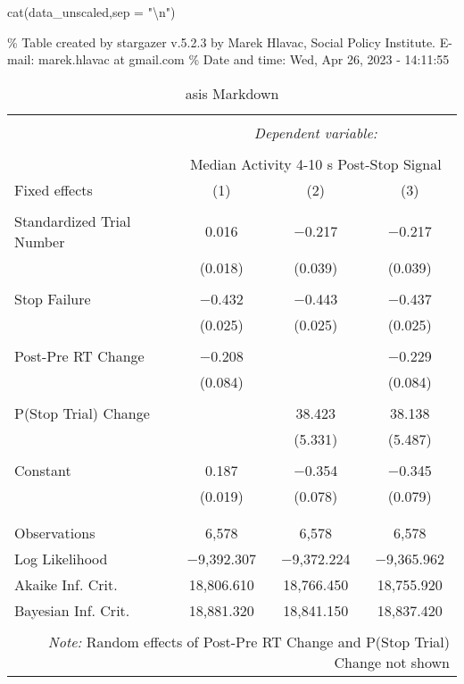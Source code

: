 \documentclass[
]{article}
\newenvironment{Shaded}{\begin{snugshade}}{\end{snugshade}}
\newcommand{\AttributeTok}[1]{\textcolor[rgb]{0.77,0.63,0.00}{#1}}
\newcommand{\FunctionTok}[1]{\textcolor[rgb]{0.00,0.00,0.00}{#1}}
\newcommand{\NormalTok}[1]{#1}
\newcommand{\SpecialCharTok}[1]{\textcolor[rgb]{0.00,0.00,0.00}{#1}}
\newcommand{\StringTok}[1]{\textcolor[rgb]{0.31,0.60,0.02}{#1}}
\begin{document}
\begin{Shaded}
\begin{Highlighting}[]
\FunctionTok{cat}\NormalTok{(data\_unscaled,}\AttributeTok{sep =} \StringTok{"}\SpecialCharTok{\textbackslash{}n}\StringTok{"}\NormalTok{)}
\end{Highlighting}
\end{Shaded}

\% Table created by stargazer v.5.2.3 by Marek Hlavac, Social Policy
Institute. E-mail: marek.hlavac at gmail.com \% Date and time: Wed, Apr
26, 2023 - 14:11:55

\begin{table}[!htbp] \centering 
  \caption{asis Markdown} 
  \label{} 
\begin{tabular}{@{\extracolsep{5pt}}lccc} 
\\[-1.8ex]\hline 
\hline \\[-1.8ex] 
 & \multicolumn{3}{c}{\textit{Dependent variable:}} \\ 
\cline{2-4} 
\\[-1.8ex] & \multicolumn{3}{c}{Median Activity 4-10 s Post-Stop Signal} \\ 
Fixed effects & (1) & (2) & (3)\\ 
\hline \\[-1.8ex] 
 Standardized Trial Number & 0.016 & $-$0.217 & $-$0.217 \\ 
  & (0.018) & (0.039) & (0.039) \\ 
  & & & \\ 
 Stop Failure & $-$0.432 & $-$0.443 & $-$0.437 \\ 
  & (0.025) & (0.025) & (0.025) \\ 
  & & & \\ 
 Post-Pre RT Change & $-$0.208 &  & $-$0.229 \\ 
  & (0.084) &  & (0.084) \\ 
  & & & \\ 
 P(Stop Trial) Change &  & 38.423 & 38.138 \\ 
  &  & (5.331) & (5.487) \\ 
  & & & \\ 
 Constant & 0.187 & $-$0.354 & $-$0.345 \\ 
  & (0.019) & (0.078) & (0.079) \\ 
  & & & \\ 
\hline \\[-1.8ex] 
Observations & 6,578 & 6,578 & 6,578 \\ 
Log Likelihood & $-$9,392.307 & $-$9,372.224 & $-$9,365.962 \\ 
Akaike Inf. Crit. & 18,806.610 & 18,766.450 & 18,755.920 \\ 
Bayesian Inf. Crit. & 18,881.320 & 18,841.150 & 18,837.420 \\ 
\hline 
\hline \\[-1.8ex] 
\multicolumn{4}{r}{\textit{Note:} Random effects of Post-Pre RT Change and P(Stop Trial) Change not shown} \\ 
\end{tabular} 
\end{table}
\end{document}

